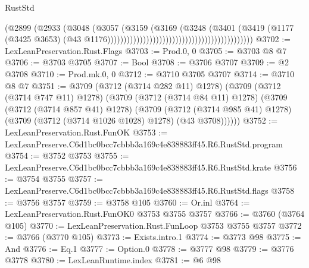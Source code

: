 \begin{lexlean}{RustStd}
\begin{coremodule}
                                                                        (@2899
                                                                          (@2933
                                                                            (@3048
                                                                              (@3057
                                                                                (@3159
                                                                                  (@3169
                                                                                    (@3248
                                                                                      (@3401
                                                                                        (@3419
                                                                                          (@1177
                                                                                            (@3425
                                                                                              @3653)
                                                                                            (@43
                                                                                              @1176)))))))))))))))))))))))))))))))))))))))))))))
@3702 := LexLeanPreservation.Rust.Flags
@3703 := Prod.{0, 0}
@3705 := @3703 @8 @7
@3706 := @3703 @3705
@3707 := Bool
@3708 := @3706 @3707
@3709 := @2 @3708
@3710 := Prod.mk.{0, 0}
@3712 := @3710 @3705 @3707
@3714 := @3710 @8 @7
@3751 := @3709
    (@3712 (@3714 @282 @11) @1278)
    (@3709
      (@3712 (@3714 @747 @11) @1278)
      (@3709
        (@3712 (@3714 @84 @11) @1278)
        (@3709
          (@3712 (@3714 @857 @41) @1278)
          (@3709
            (@3712 (@3714 @985 @41) @1278)
            (@3709 (@3712 (@3714 @1026 @1028) @1278) (@43 @3708))))))
@3752 := LexLeanPreservation.Rust.FunOK
@3753 := LexLeanPreserve.C6d1bc0bcc7cbbb3a169c4e838883ff45.R6.RustStd.program
@3754 := @3752 @3753
@3755 := LexLeanPreserve.C6d1bc0bcc7cbbb3a169c4e838883ff45.R6.RustStd.krate
@3756 := @3754 @3755
@3757 := LexLeanPreserve.C6d1bc0bcc7cbbb3a169c4e838883ff45.R6.RustStd.flags
@3758 := @3756 @3757
@3759 := @3758 @105
@3760 := Or.inl
@3764 := LexLeanPreservation.Rust.FunOK0 @3753 @3755 @3757
@3766 := @3760 (@3764 @105)
@3770 := LexLeanPreservation.Rust.FunLoop @3753 @3755 @3757
@3772 := @3766 (@3770 @105)
@3773 := Exists.intro.{1}
@3774 := @3773 @98
@3775 := And
@3776 := Eq.{1}
@3777 := Option.{0}
@3778 := @3777 @98
@3779 := @3776 @3778
@3780 := LexLeanRuntime.index
@3781 := @6 @98

\end{coremodule}
\end{lexlean}
